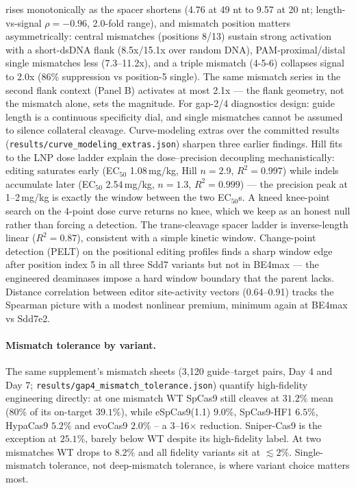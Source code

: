 \documentclass[12pt]{article}
\begin{document}
rises monotonically as the spacer shortens (4.76 at 49 nt to 9.57 at
20 nt; length-vs-signal $\rho=-0.96$, 2.0-fold range), and mismatch
position matters asymmetrically: central mismatches (positions 8/13)
sustain strong activation with a short-dsDNA flank (8.5x/15.1x over
random DNA), PAM-proximal/distal single mismatches less (7.3--11.2x),
and a triple mismatch (4-5-6) collapses signal to 2.0x (86\%
suppression vs position-5 single). The same mismatch series in the
second flank context (Panel B) activates at most 2.1x --- the flank
geometry, not the mismatch alone, sets the magnitude. For gap-2/4
diagnostics design: guide length is a continuous specificity dial,
and single mismatches cannot be assumed to silence collateral
cleavage.
Curve-modeling extras over the committed results
(\texttt{results/curve\_modeling\_extras.json}) sharpen three earlier
findings. Hill fits to the LNP dose ladder explain the dose--precision
decoupling mechanistically: editing saturates early (EC$_{50}$
1.08\,mg/kg, Hill $n=2.9$, $R^2=0.997$) while indels accumulate later
(EC$_{50}$ 2.54\,mg/kg, $n=1.3$, $R^2=0.999$) --- the precision peak
at 1--2\,mg/kg is exactly the window between the two EC$_{50}$s. A
kneed knee-point search on the 4-point dose curve returns no knee,
which we keep as an honest null rather than forcing a detection.
The trans-cleavage spacer ladder is inverse-length linear
($R^2=0.87$), consistent with a simple kinetic window. Change-point
detection (PELT) on the positional editing profiles finds a sharp
window edge after position index 5 in all three Sdd7 variants but not
in BE4max --- the engineered deaminases impose a hard window boundary
that the parent lacks. Distance correlation between editor
site-activity vectors (0.64--0.91) tracks the Spearman picture with a
modest nonlinear premium, minimum again at BE4max vs Sdd7e2.



























\paragraph{Mismatch tolerance by variant.} The same supplement's
mismatch sheets (3{,}120 guide--target pairs, Day 4 and Day 7;
\texttt{results/gap4\_mismatch\_tolerance.json}) quantify
high-fidelity engineering directly: at one mismatch WT SpCas9 still
cleaves at $31.2\%$ mean (80\% of its on-target $39.1\%$), while
eSpCas9(1.1) $9.0\%$, SpCas9-HF1 $6.5\%$, HypaCas9 $5.2\%$ and evoCas9
$2.0\%$ -- a 3--16$\times$ reduction. Sniper-Cas9 is the exception at
$25.1\%$, barely below WT despite its high-fidelity label. At two
mismatches WT drops to $8.2\%$ and all fidelity variants sit at
${\lesssim}2\%$. Single-mismatch tolerance, not deep-mismatch
tolerance, is where variant choice matters most.
\end{document}
